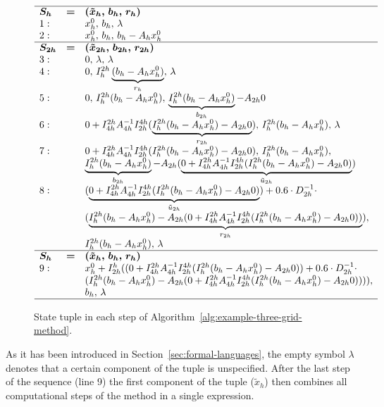 \begin{figure}
	\begin{equation*}
		\begin{array}{l l l}
			\hline
			\bm{S_h} & \bm{=} & \bm{(\tilde{x}_h, \, b_h, \, r_h)}  \\
			1: & &  x_{h}^0, \, b_h, \, \lambda \\
			2: & &  x_{h}^0, \, b_h, \, b_{h} - A_h x_{h}^0 \\ \hline
			\bm{S_{2h}} & \bm{=} &  \bm{(\tilde{x}_{2h}, \, b_{2h}, \, r_{2h})} \\
			3: & &  0, \, \lambda, \, \lambda \\
			4: & &  0, \, I_{h}^{2h}\underbrace{(b_{h} - A_h x_{h}^0)}_{r_{h}}, \, \lambda \\
			5: & &  0, \, I_{h}^{2h}(b_{h} - A_h x_{h}^0), \,\underbrace{I_{h}^{2h}(b_{h} - A_h x_{h}^0)}_{b_{2h}} - A_{2h} 0 \\
			6: & & 0 + I_{4h}^{2h} A_{4h}^{-1} I_{2h}^{4h} (\underbrace{I_{h}^{2h}(b_{h} - A_h x_{h}^0) - A_{2h} 0}_{r_{2h}}), \, I_{h}^{2h}(b_{h} - A_h x_{h}^0), \, \lambda\\
			7: & & 0 + I_{4h}^{2h} A_{4h}^{-1} I_{2h}^{4h} (I_{h}^{2h}(b_{h} - A_h x_{h}^0) - A_{2h} 0), \, I_{h}^{2h}(b_{h} - A_h x_{h}^0), \\ 
			& &  \underbrace{I_{h}^{2h}(b_{h} - A_h x_{h}^0)}_{b_{2h}} - A_{2h} (\underbrace{0 + I_{4h}^{2h} A_{4h}^{-1} I_{2h}^{4h} (I_{h}^{2h}(b_{h} - A_h x_{h}^0) - A_{2h} 0)}_{\tilde{u}_{2h}}) \\
			8: & &   (\underbrace{0 + I_{4h}^{2h} A_{4h}^{-1} I_{2h}^{4h} (I_{h}^{2h}(b_{h} - A_h x_{h}^0) - A_{2h} 0)}_{\tilde{u}_{2h}}) + 0.6 \cdot D_{2h}^{-1} \cdot \\ 
			& & (\underbrace{I_{h}^{2h}(b_{h} - A_h x_{h}^0) - A_{2h} (0 + I_{4h}^{2h} A_{4h}^{-1} I_{2h}^{4h} (I_{h}^{2h}(b_{h} - A_h x_{h}^0) - A_{2h} 0))}_{r_{2h}}), \\ 
			& & I_{h}^{2h}(b_{h} - A_h x_{h}^0), \, \lambda \\ \hline 
			\bm{S_h} & \bm{=} & \bm{(\tilde{x}_h, \, b_h, \, r_h)}  \\
			9: & & x_{h}^0 + I_{2h}^h ((0 + I_{4h}^{2h} A_{4h}^{-1} I_{2h}^{4h} (I_{h}^{2h}(b_{h} - A_h x_{h}^0) - A_{2h} 0)) + 0.6 \cdot D_{2h}^{-1} \cdot \\ 
			& &  (I_{h}^{2h}(b_{h} - A_h x_{h}^0) - A_{2h} (0 + I_{4h}^{2h} A_{4h}^{-1} I_{2h}^{4h} (I_{h}^{2h}(b_{h} - A_h x_{h}^0) - A_{2h} 0)))), \\ 
			& &  b_h, \, \lambda \\
			\hline
		\end{array}
	\end{equation*}
	\caption{State tuple in each step of Algorithm~\ref{alg:example-three-grid-method}.}
	\label{fig:example-tree-grid-method-states}
\end{figure}
As it has been introduced in Section~\ref{sec:formal-languages}, the empty symbol $\lambda$ denotes that a certain component of the tuple is unspecified.
After the last step of the sequence (line 9) the first component of the tuple ($\tilde{x}_h$) then combines all computational steps of the method in a single expression.

